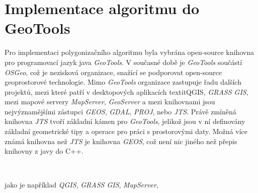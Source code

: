 \chapter{Implementace algoritmu do GeoTools}
\label{chap:implementacealgoritmudogeotools}
	Pro implementaci polygonizačního algoritmu byla vybrána open-source knihovna pro programovací jazyk java \textit{GeoTools}. V současné době je \textit{GeoTools} součástí \textit{OSGeo}, což je nezisková organizace, snažící se podporovat open-source geoprostorové technologie. Mimo \textit{GeoTools} organizace zastupuje řadu dalších projektů, mezi které patří v desktopových aplikacích textit{QGIS}, \textit{GRASS GIS}, mezi mapové servery \textit{MapServer}, \textit{GeoServer} a mezi knihovnami jsou nejvýznamějšími zástupci \textit{GEOS}, \textit{GDAL}, \textit{PROJ}, nebo \textit{JTS}. Právě zmíněná knihovna \textit{JTS} tvoří základní kámen pro \textit{GeoTools}, jelikož jsou v ní definovány základní geometrické tipy a operace pro práci s prostorovými daty. Možná více známá knihovna než \textit{JTS} je knihovna \textit{GEOS}, což není nic jiného než přepis knihovny z javy do C++.
	
	
\
	
	
	jako je například \textit{QGIS}, \textit{GRASS GIS}, \textit{MapServer},

	

